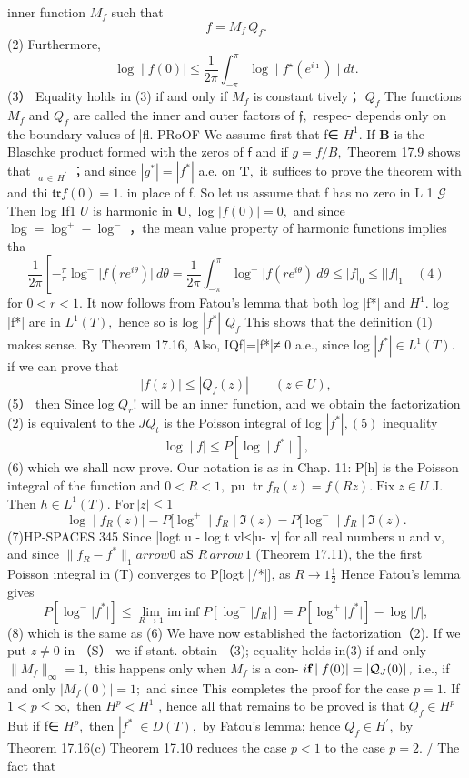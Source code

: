 inner function $\textstyle{M_{f}}$ such that $$ f=M_{f}\,Q_{f}. $$ (2) Furthermore, $$ \log\mid f(0)\mid\leq{\frac{1}{2\pi}}\int_{-\pi}^{\pi}\log\mid f^{\star}(e^{i\imath})\mid d t. $$ (3） Equality holds in (3) if and only if $\textstyle{M_{f}}$ is constant tively； $Q_{f}$ The functions $M_{f}$ and $Q_{f}$ are called the inner and outer factors of ${\mathfrak{f}},$ respec- depends only on the boundary values of |fl. PRoOF We assume first that f∈ $H^{1}.$ If $\boldsymbol{B}$ is the Blaschke product formed with the zeros of $\boldsymbol{\mathsf{f}}$ and if $g=f/B,$ Theorem 17.9 shows that $\;_{a\,\in\,H^{\prime}}$ ；and since $|g^{*}|=|f^{*}|$ a.e. on ${\boldsymbol{T}},$ it suffices to prove the theorem with and thi ${\mathfrak{t r}}f(0)=1.$ in place of f. So let us assume that f has no zero in L 1 $\scriptstyle{\mathcal{G}}$ Then log If1 $U$ is harmonic in ${\boldsymbol{U}},$ log $|f(0)|=0,$ and since $\log=\log^{+}-\log^{-}$ ，the mean value property of harmonic functions implies tha $$ \frac{1}{2\pi}\left[-_{\pi}^{\pi}\log^{-}\vert f(r e^{i\theta})\vert\ d\theta=\frac{1}{2\pi}\int_{-\pi}^{\pi}\log^{+}\vert f(r e^{i\theta})\ d\theta\leq\vert f\vert_{0}\leq\vert\vert f\vert_{1}\right.\quad(4) $$ for $0<r<1.$ It now follows from Fatou's lemma that both log |f*| and $H^{1}.$ log |f*| are in $L^{1}(T),$ hence so is log $|f^{\ast}|$ $Q_{f}$ This shows that the definition (1) makes sense. By Theorem 17.16, Also, IQf|=|f*|≠ 0 a.e., since log $|f^{*}|\in L^{1}(T).$ if we can prove that $$ |f(z)|\leq|Q_{f}(z)|\qquad(z\in U), $$ (5） then Since log $\scriptstyle Q_{r}!$ will be an inner function, and we obtain the factorization (2) is equivalent to the $J Q_{t}$ is the Poisson integral of log $|f^{*}|,(5)$ inequality $$ \log\mid f\mid\leq P[\log\mid f^{*}\mid], $$ (6) which we shall now prove. Our notation is as in Chap. 11: P[h] is the Poisson integral of the function and $0<R<1,$ pu $\operatorname{tr}f_{R}(z)=f(R z).\operatorname{Fix}z\in U$ J. Then $h\in L^{1}(T).$ $\mathrm{For}\,|z|\leq1$ $$ \log\mid f_{R}(z)\mid=P[\log^{+}\mid f_{R}\mid\Im(z)-P[\log^{-}\mid f_{R}\mid\Im(z). $$ (7)HP-SPACES 345 Since |logt u - log t vl≤|u- v| for all real numbers u and v, and since $\|f_{R}-f^{*}\|_{1} arrow0$ aS $\scriptstyle R\, arrow\,1$ (Theorem 17.11), the the first Poisson integral in (T) converges to P[logt |/*|], as $\scriptstyle{R\to1{\frac{1}{2}}}$ Hence Fatou's lemma gives $$ P[\log^{-}\vert f^{*}\vert]\leq\operatorname*{lim}_{R\to1}\mathrm{im}\mathop{\operatorname*{inf}}P[\log^{-}\vert f_{R}\vert]=P[\log^{+}\vert f^{*}\vert]-\log\vert f\vert, $$ (8) which is the same as (6) We have now established the factorization（2). If we put $\scriptstyle z\neq0$ in （S） we if stant. obtain （3); equality holds in(3) if and only $\|M_{f}\|_{\infty}=1,$ this happens only when $\textstyle{M_{f}}$ is a con- $i{\bf f}\!\mid f(0)|=|{\cal Q}_{J}(0)|\,,$ i.e., if and only $|M_{f}(0)|=1;$ and since This completes the proof for the case $\scriptstyle p=1.$ If $1<p\leq\infty,$ then $H^{p}<H^{1}$ , hence all that remains to be proved is that $Q_{f}\in H^{p}$ But if f∈ $H^{p},$ then $|f^{*}|\in D(T),$ by Fatou's lemma; hence $Q_{f}\in H^{\prime},$ by Theorem 17.16(c) Theorem 17.10 reduces the case $\scriptstyle{p<1}$ to the case $p=2.$ / The fact that 